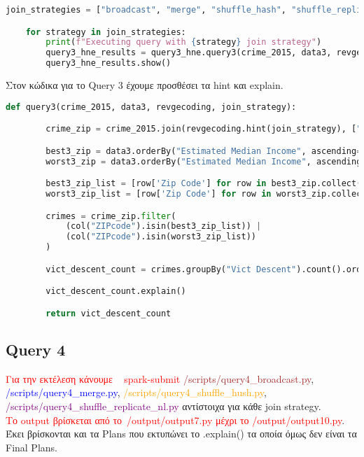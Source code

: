 \documentclass{article}
\begin{document}
\vspace{3\baselineskip}

\begin{lstlisting}[language = Python]
    join_strategies = ["broadcast", "merge", "shuffle_hash", "shuffle_replicate_nl"]

    for strategy in join_strategies:
        print(f"Executing query with {strategy} join strategy")
        query3_hne_results = query3_hne.query3(crime_2015, data3, revgecoding, strategy)
        query3_hne_results.show()
\end{lstlisting}

\vspace{1\baselineskip}

Στον κώδικα για το Query 3 έχουμε προσθέσει τα hint και explain.\\

\begin{lstlisting}[language = Python]
    def query3(crime_2015, data3, revgecoding, join_strategy):

        crime_zip = crime_2015.join(revgecoding.hint(join_strategy), ["LAT", "LON"], "left")

        best3_zip = data3.orderBy("Estimated Median Income", ascending=False).limit(3)
        worst3_zip = data3.orderBy("Estimated Median Income", ascending=True).limit(3)

        best3_zip_list = [row['Zip Code'] for row in best3_zip.collect()]
        worst3_zip_list = [row['Zip Code'] for row in worst3_zip.collect()]

        crimes = crime_zip.filter(
            (col("ZIPcode").isin(best3_zip_list)) |
            (col("ZIPcode").isin(worst3_zip_list))
        )

        vict_descent_count = crimes.groupBy("Vict Descent").count().orderBy("count", ascending=False)

        vict_descent_count.explain()

        return vict_descent_count
\end{lstlisting}


\subsection*{Query 4}

\textcolor{red}{Για την εκτέλεση κάνουμε   spark-submit} \textcolor{brown}{ /scripts/query4\_broadcast.py}, \textcolor{blue}{ /scripts/query4\_merge.py},  \textcolor{orange}{ /scripts/query4\_shuffle\_hush.py}, \textcolor{purple}{ /scripts/query4\_shuffle\_replicate\_nl.py} αντίστοιχα για κάθε join strategy.   \\
\textcolor{red}{Το output βρίσκεται από το /output/output7.py μέχρι το /output/output10.py}. \\
Έκει βρίσκονται και τα Plans που εκτυπώνει το .explain() τα οποία όμως δεν είναι τα Final Plans. \\ 
\end{document}
